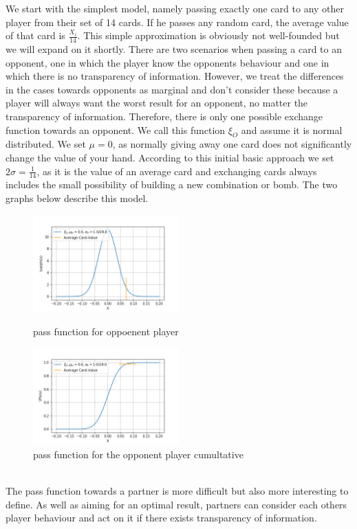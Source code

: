 We start with the simplest model, namely passing exactly one card to any other player from their set of 14 cards. If he passes any random card, the average value of that card is $\frac{X_i}{14}$. This simple approximation is obviously not well-founded but we will expand on it shortly. There are two scenarios when passing a card to an opponent, one in which the player know the opponents behaviour and one in which there is no transparency of information. However, we treat the differences in the cases towards opponents as marginal and don’t consider these because a player will always want the worst result for an opponent, no matter the transparency of information. Therefore, there is only one possible exchange function towards an opponent. We call this function $\xi_O$ and assume it is normal distributed. We set $\mu = 0$, as normally giving away one card does not significantly change the value of your hand. According to this initial basic approach we set $2\sigma = \frac{1}{14}$, as it is the value of an average card and exchanging cards always includes the small possibility of building a new combination or bomb. The two graphs below describe this model.
 \\
\begin{figure}[h]
    \centering
    \includegraphics[width=0.5\textwidth]{Bilder/pass_function_ot}
    \caption{pass function for oppoenent player}
    \label{fig:4}
    \centering
    \includegraphics[width=0.5\textwidth]{Bilder/pass_function_ot_cumultative}
    \caption{pass function for the opponent player cumultative}
    \label{fig:5}
\end{figure}
\\
The pass function towards a partner is more difficult but also more interesting to define. As well as aiming for an optimal result, partners can consider each others player behaviour and act on it if there exists transparency of information.

